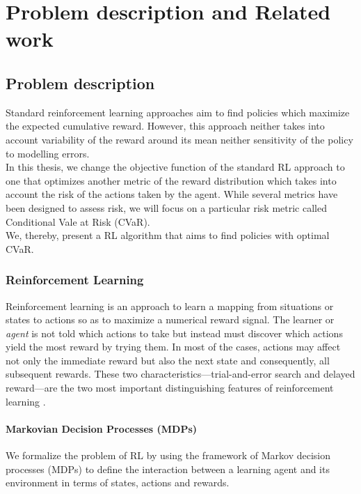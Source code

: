 \chapter{Problem description and Related work}
\label{sec:problem_description}
\section{Problem description}

Standard reinforcement learning approaches aim to find policies which maximize the expected cumulative reward.
However, this approach neither takes into account variability of the reward around its mean
neither sensitivity of the policy to modelling errors.\\
In this thesis, we change the objective function of the
standard RL approach to one that optimizes another metric of the reward distribution which
takes into account the risk of the actions taken by the agent.
While several metrics have been designed to assess risk, we will focus on a particular risk metric
called Conditional Vale at Risk (CVaR).\\
We, thereby, present a RL algorithm that aims to find policies with optimal CVaR.

\subsection{Reinforcement Learning}

Reinforcement learning is an approach to learn a mapping from situations or states to actions so as to maximize 
a numerical reward signal. The learner or \textit{agent} is not told which actions to take
but instead must discover which actions yield the most reward by trying them. In most of the cases,
actions may affect not only the immediate reward but also the next state and consequently, all subsequent rewards.
These two characteristics—trial-and-error search and delayed reward—are the two most important
distinguishing features of reinforcement learning \citep{Sutton1998}.

\subsubsection{Markovian Decision Processes (MDPs)}
We formalize the problem of RL by using the framework of Markov decision processes (MDPs)
to define the interaction between a learning agent and its environment in terms of states,
actions and rewards.

